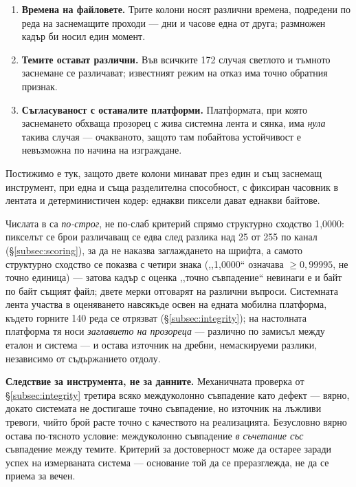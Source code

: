 \begin{enumerate}[topsep=2pt,itemsep=1pt,leftmargin=*]
\item \textbf{Времена на файловете.} Трите колони носят различни времена, подредени по реда на
      заснемащите проходи --- дни и часове една от друга; размножен кадър би носил един момент.
\item \textbf{Темите остават различни.} Във всичките 172 случая светлото и тъмното заснемане се
      различават; известният режим на отказ има точно обратния признак.
\item \textbf{Съгласуваност с останалите платформи.} Платформата, при която заснемането обхваща
      прозорец с жива системна лента и сянка, има \emph{нула} такива случая --- очакваното, защото
      там побайтова устойчивост е невъзможна по начина на изграждане.
\end{enumerate}

Постижимо е тук, защото двете колони минават през един и същ заснемащ инструмент, при една и съща
разделителна способност, с фиксиран часовник в лентата и детерминистичен кодер: еднакви пиксели
дават еднакви байтове.

Числата в  са \emph{по-строг}, не по-слаб критерий спрямо структурно сходство
1{,}0000: пикселът се брои различаващ се едва след разлика над 25 от 255 по канал
(§\ref{subsec:scoring}), за да не наказва заглаждането на шрифта, а самото структурно сходство се
показва с четири знака (,,1{,}0000“ означава $\geq 0{,}99995$, не точно единица) --- затова кадър
с оценка ,,точно съвпадение“ невинаги е и байт по байт същият файл; двете мерки отговарят на
различни въпроси. Системната лента участва в оценяването навсякъде освен на едната мобилна
платформа, където горните 140 реда се отрязват (§\ref{subsec:integrity}); на настолната платформа
тя носи \emph{заглавието на прозореца} --- различно по замисъл между еталон и система --- и остава
източник на дребни, немаскируеми разлики, независимо от съдържанието отдолу.

\textbf{Следствие за инструмента, не за данните.} Механичната проверка от §\ref{subsec:integrity}
третира всяко междуколонно съвпадение като дефект --- вярно, докато системата не достигаше точно
съвпадение, но източник на лъжливи тревоги, чийто брой расте точно с качеството на реализацията.
Безусловно вярно остава по-тясното условие: междуколонно съвпадение \emph{в съчетание със}
съвпадение между темите. Критерий за достоверност може да остарее заради успех на измерваната
система --- основание той да се преразглежда, не да се приема за вечен.

